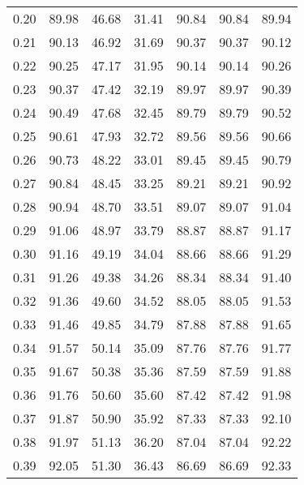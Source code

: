 \begin{tabular}{|c|c|c|c|c|c|c|}
      0.20 &     89.98 &     46.68 &      31.41 &   90.84 &      90.84 &         89.94 \\
      0.21 &     90.13 &     46.92 &      31.69 &   90.37 &      90.37 &         90.12 \\
      0.22 &     90.25 &     47.17 &      31.95 &   90.14 &      90.14 &         90.26 \\
      0.23 &     90.37 &     47.42 &      32.19 &   89.97 &      89.97 &         90.39 \\
      0.24 &     90.49 &     47.68 &      32.45 &   89.79 &      89.79 &         90.52 \\
      0.25 &     90.61 &     47.93 &      32.72 &   89.56 &      89.56 &         90.66 \\
      0.26 &     90.73 &     48.22 &      33.01 &   89.45 &      89.45 &         90.79 \\
      0.27 &     90.84 &     48.45 &      33.25 &   89.21 &      89.21 &         90.92 \\
      0.28 &     90.94 &     48.70 &      33.51 &   89.07 &      89.07 &         91.04 \\
      0.29 &     91.06 &     48.97 &      33.79 &   88.87 &      88.87 &         91.17 \\
      0.30 &     91.16 &     49.19 &      34.04 &   88.66 &      88.66 &         91.29 \\
      0.31 &     91.26 &     49.38 &      34.26 &   88.34 &      88.34 &         91.40 \\
      0.32 &     91.36 &     49.60 &      34.52 &   88.05 &      88.05 &         91.53 \\
      0.33 &     91.46 &     49.85 &      34.79 &   87.88 &      87.88 &         91.65 \\
      0.34 &     91.57 &     50.14 &      35.09 &   87.76 &      87.76 &         91.77 \\
      0.35 &     91.67 &     50.38 &      35.36 &   87.59 &      87.59 &         91.88 \\
      0.36 &     91.76 &     50.60 &      35.60 &   87.42 &      87.42 &         91.98 \\
      0.37 &     91.87 &     50.90 &      35.92 &   87.33 &      87.33 &         92.10 \\
      0.38 &     91.97 &     51.13 &      36.20 &   87.04 &      87.04 &         92.22 \\
      0.39 &     92.05 &     51.30 &      36.43 &   86.69 &      86.69 &         92.33 \\

\end{tabular}
